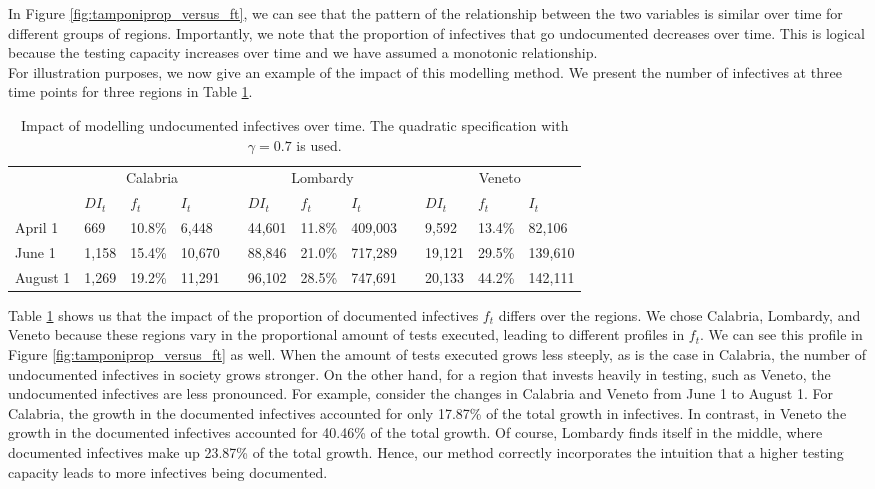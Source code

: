 \documentclass[12pt]{article}
\begin{document}
	In Figure \ref{fig:tamponiprop_versus_ft}, we can see that the pattern of the relationship between the two variables is similar over time for different groups of regions. Importantly, we note that the proportion of infectives that go undocumented decreases over time. This is logical because the testing capacity increases over time and we have assumed a monotonic relationship. \\
	
	For illustration purposes, we now give an example of the impact of this modelling method. We present the number of infectives at three time points for three regions in Table \ref{tab:f_t_over_time}.
	
	\begin{table}[H]
		\centering
		\caption{Impact of modelling undocumented infectives over time. The quadratic specification with $\gamma = 0.7$ is used.}
		\label{tab:f_t_over_time}
		\begin{tabular}{llllllllllll}
		    \toprule 
                     & \multicolumn{3}{c}{Calabria} && \multicolumn{3}{c}{Lombardy} && \multicolumn{3}{c}{Veneto} \\
                     \cmidrule{2-4}\cmidrule{6-8}\cmidrule{10-12}
                     & $DI_t$  & $f_t$   & $I_t$   && $DI_t$  & $f_t$   & $I_t$    && $DI_t$  & $f_t$  & $I_t$   \\ \midrule
            April 1  & 669     & 10.8\%  & 6,448   && 44,601  & 11.8\%  & 409,003  && 9,592   & 13.4\% & 82,106  \\
            June 1   & 1,158   & 15.4\%  & 10,670  && 88,846  & 21.0\%  & 717,289  && 19,121  & 29.5\% & 139,610 \\
            August 1 & 1,269   & 19.2\%  & 11,291  && 96,102  & 28.5\%  & 747,691  && 20,133  & 44.2\% & 142,111 \\ \bottomrule
        \end{tabular}
	\end{table}
	
	Table \ref{tab:f_t_over_time} shows us that the impact of the proportion of documented infectives $f_t$ differs over the regions. We chose Calabria, Lombardy, and Veneto because these regions vary in the proportional amount of tests executed, leading to different profiles in $f_t$. We can see this profile in Figure \ref{fig:tamponiprop_versus_ft} as well. When the amount of tests executed grows less steeply, as is the case in Calabria, the number of undocumented infectives in society grows stronger. On the other hand, for a region that invests heavily in testing, such as Veneto, the undocumented infectives are less pronounced. For example, consider the changes in Calabria and Veneto from June 1 to August 1. For Calabria, the growth in the documented infectives accounted for only 17.87\% of the total growth in infectives. In contrast, in Veneto the growth in the documented infectives accounted for 40.46\% of the total growth. Of course, Lombardy finds itself in the middle, where documented infectives make up 23.87\% of the total growth. Hence, our method correctly incorporates the intuition that a higher testing capacity leads to more infectives being documented. \\
	
\end{document}
